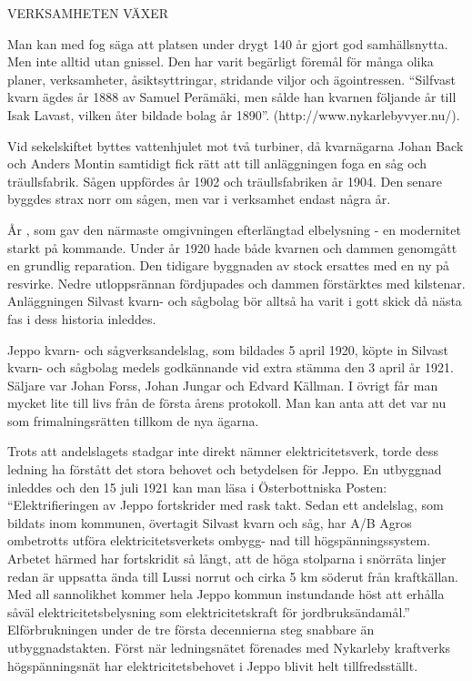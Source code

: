 VERKSAMHETEN VÄXER

Man kan med fog säga att platsen under drygt 140 år gjort god samhällsnytta. Men inte alltid utan gnissel. Den har varit begärligt föremål för många olika planer, verksamheter, åsiktsyttringar, stridande viljor och ägointressen. ``Silfvast kvarn ägdes år 1888 av Samuel Perämäki, men sålde han kvarnen följande år till Isak Lavast, vilken åter bildade bolag år 1890''. (http://www.nykarlebyvyer.nu/).

Vid sekelskiftet byttes vattenhjulet mot två turbiner, då kvarnägarna Johan Back och Anders Montin samtidigt fick rätt att till anläggningen foga en såg och träullsfabrik. Sågen uppfördes år 1902 och träullsfabriken år 1904. Den senare byggdes strax norr om sågen, men var i verksamhet endast några år.

År , som gav den närmaste omgivningen efterlängtad elbelysning - en modernitet starkt på kommande. Under år 1920 hade både kvarnen och dammen genomgått en grundlig reparation. Den tidigare byggnaden av stock ersattes med en ny på resvirke. Nedre utloppsrännan fördjupades och dammen förstärktes med kilstenar. Anläggningen Silvast kvarn- och sågbolag bör alltså ha varit i gott skick då nästa fas i dess historia inleddes.

Jeppo kvarn- och sågverksandelslag, som bildades 5 april 1920,  köpte in Silvast kvarn- och sågbolag medels godkännande vid extra stämma den 3 april år 1921. Säljare var Johan Forss, Johan Jungar och Edvard Källman. I övrigt får man mycket lite till livs från de första årens protokoll. Man kan anta att det var nu som frimalningsrätten tillkom de nya ägarna.

Trots att andelslagets stadgar inte direkt nämner elektricitetsverk, torde dess ledning ha förstått det stora behovet och betydelsen för Jeppo. En utbyggnad inleddes och den 15 juli 1921 kan man läsa i Österbottniska Posten: ``Elektrifieringen av Jeppo fortskrider med rask takt. Sedan ett andelslag, som bildats inom kommunen, övertagit Silvast kvarn och såg, har A/B Agros ombetrotts utföra elektricitetsverkets ombygg- nad till högspänningssystem. Arbetet härmed har fortskridit så långt, att de höga stolparna i snörräta linjer redan är uppsatta ända till Lussi norrut och cirka 5 km söderut från kraftkällan. Med all sannolikhet kommer hela Jeppo kommun instundande höst att erhålla såväl elektricitetsbelysning som elektricitetskraft för jordbruksändamål.''  Elförbrukningen under de tre första decennierna steg snabbare än utbyggnadstakten. Först när ledningsnätet förenades med Nykarleby kraftverks högspänningsnät har elektricitetsbehovet i Jeppo blivit helt tillfredsställt.

